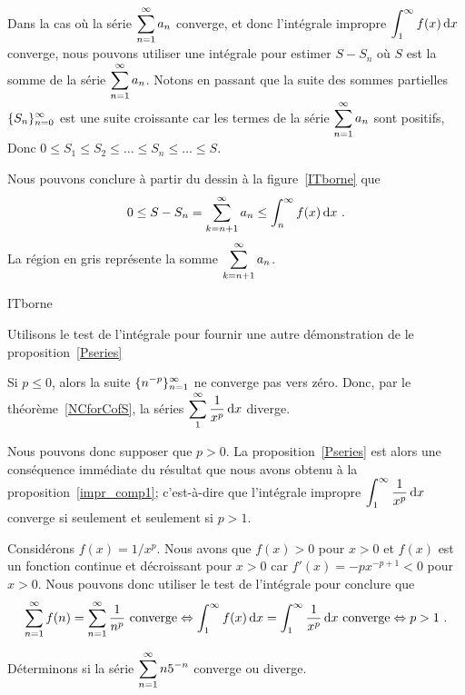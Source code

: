 {\begin{rmk}
Dans la cas où la série $\displaystyle \sum_{n=1}^\infty a_n$
converge, et donc l'intégrale impropre
$\displaystyle \int_1^\infty f(x)\,\mathrm{d}x$ converge, nous pouvons utiliser
une intégrale pour estimer $S - S_n$ où $S$ est la somme de la
série $\displaystyle \sum_{n=1}^\infty a_n$.
Notons en passant que la suite des sommes partielles
$\displaystyle \{S_n\}_{n=0}^\infty$ est une suite croissante car les
termes de la série $\displaystyle \sum_{n=1}^\infty a_n$ sont
positifs,  Donc
$0 \leq S_1 \leq S_2 \leq \ldots \leq S_n \leq \ldots \leq S$.

Nous pouvons conclure à partir du dessin à la figure~\ref{ITborne} que
\[
0 \leq S - S_n = \sum_{k=n+1}^\infty a_n \leq \int_n^\infty f(x) \,\mathrm{d}x \ .
\]
La région en gris représente la somme
$\displaystyle \sum_{k=n+1}^\infty a_n$.
\end{rmk}

{ITborne}

\begin{egg}
Utilisons le test de l'intégrale pour fournir une autre
démonstration de le proposition~\ref{Pseries}

Si $p \leq 0$, alors la suite $\displaystyle \{n^{-p}\}_{n=1}^\infty$
ne converge pas vers zéro.  Donc, par le théorème~\ref{NCforCofS},
la séries $\displaystyle \sum_1^\infty \frac{1}{x^p} \,\mathrm{d}x$
diverge.

Nous pouvons donc supposer que $p>0$.  La proposition~\ref{Pseries} est alors
une conséquence immédiate du résultat que nous avons obtenu à
la proposition~\ref{impr_comp1}; c'est-à-dire que l'intégrale impropre
$\displaystyle \int_1^\infty \frac{1}{x^p} \,\mathrm{d}x$ converge si seulement et
seulement si $p>1$.

Considérons $f(x) = 1/x^p$.  Nous avons que $f(x)>0$ pour $x>0$ et
$f(x)$ est un fonction continue et décroissant pour $x>0$ car
$f'(x) = -p x^{-p+1} <0$ pour $x>0$.  Nous pouvons donc utiliser le test de
l'intégrale pour conclure que
\[
\sum_{n=1}^\infty f(n)= \sum_{n=1}^\infty \frac{1}{n^p}
\text{ converge} \Leftrightarrow 
\int_1^\infty f(x) \,\mathrm{d}x = \int_1^\infty \frac{1}{x^p} \,\mathrm{d}x
\text{ converge} \Leftrightarrow
p>1 \ .
\]
\end{egg}

\begin{egg}
Déterminons si la série $\displaystyle \sum_{n=1}^\infty n 5^{-n}$
converge ou diverge.


\end{egg}}
